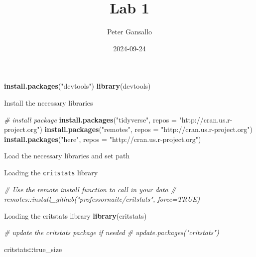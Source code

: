 \documentclass[
]{article}
\title{Lab 1}
\author{Peter Gansallo}
\date{2024-09-24}
\newenvironment{Shaded}{\begin{snugshade}}{\end{snugshade}}
\newcommand{\AttributeTok}[1]{\textcolor[rgb]{0.13,0.29,0.53}{#1}}
\newcommand{\CommentTok}[1]{\textcolor[rgb]{0.56,0.35,0.01}{\textit{#1}}}
\newcommand{\FunctionTok}[1]{\textcolor[rgb]{0.13,0.29,0.53}{\textbf{#1}}}
\newcommand{\NormalTok}[1]{#1}
\newcommand{\SpecialCharTok}[1]{\textcolor[rgb]{0.81,0.36,0.00}{\textbf{#1}}}
\newcommand{\StringTok}[1]{\textcolor[rgb]{0.31,0.60,0.02}{#1}}
\begin{document}
\maketitle

\begin{Shaded}
\begin{Highlighting}[]
\FunctionTok{install.packages}\NormalTok{(}\StringTok{"devtools"}\NormalTok{)}
\FunctionTok{library}\NormalTok{(devtools)}
\end{Highlighting}
\end{Shaded}

Install the necessary libraries

\begin{Shaded}
\begin{Highlighting}[]
\CommentTok{\# install package}
\FunctionTok{install.packages}\NormalTok{(}\StringTok{"tidyverse"}\NormalTok{, }\AttributeTok{repos =} \StringTok{"http://cran.us.r{-}project.org"}\NormalTok{)}
\FunctionTok{install.packages}\NormalTok{(}\StringTok{"remotes"}\NormalTok{, }\AttributeTok{repos =} \StringTok{"http://cran.us.r{-}project.org"}\NormalTok{)}
\FunctionTok{install.packages}\NormalTok{(}\StringTok{"here"}\NormalTok{, }\AttributeTok{repos =} \StringTok{"http://cran.us.r{-}project.org"}\NormalTok{)}
\end{Highlighting}
\end{Shaded}

Load the necessary libraries and set path

Loading the \texttt{critstats} library

\begin{Shaded}
\begin{Highlighting}[]
\CommentTok{\# Use the remote install function to call in your data}
\CommentTok{\# remotes::install\_github("professornaite/critstats", force=TRUE)}

\NormalTok{Loading the }\StringTok{\textasciigrave{}}\AttributeTok{critstats}\StringTok{\textasciigrave{}}\NormalTok{ library}
\FunctionTok{library}\NormalTok{(critstats)}

\CommentTok{\# update the \textasciigrave{}critstats\textasciigrave{} package if needed}
\CommentTok{\# update.packages("critstats")}
\end{Highlighting}
\end{Shaded}

\begin{Shaded}
\begin{Highlighting}[]
\NormalTok{critstats}\SpecialCharTok{::}\NormalTok{true\_size}
\end{Highlighting}
\end{Shaded}
\end{document}
